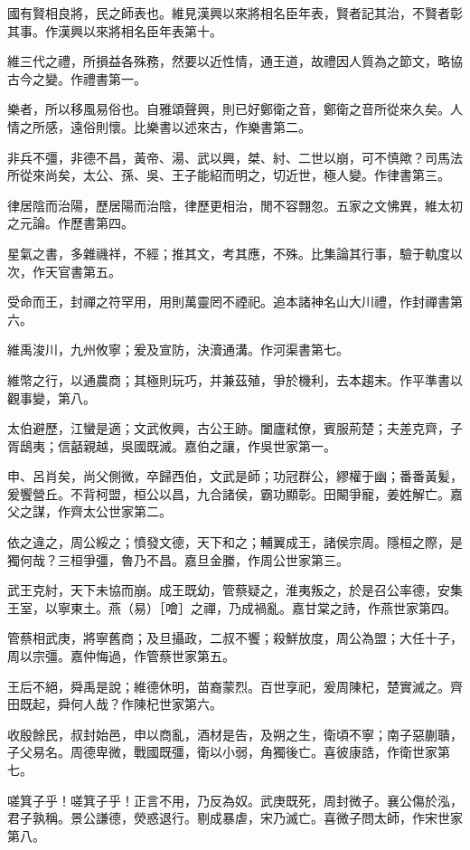 \begin{pinyinscope}
國有賢相良將，民之師表也。維見漢興以來將相名臣年表，賢者記其治，不賢者彰其事。作漢興以來將相名臣年表第十。

維三代之禮，所損益各殊務，然要以近性情，通王道，故禮因人質為之節文，略協古今之變。作禮書第一。

樂者，所以移風易俗也。自雅頌聲興，則已好鄭衛之音，鄭衛之音所從來久矣。人情之所感，遠俗則懷。比樂書以述來古，作樂書第二。

非兵不彊，非德不昌，黃帝、湯、武以興，桀、紂、二世以崩，可不慎歟？司馬法所從來尚矣，太公、孫、吳、王子能紹而明之，切近世，極人變。作律書第三。

律居陰而治陽，歷居陽而治陰，律歷更相治，閒不容翲忽。五家之文怫異，維太初之元論。作歷書第四。

星氣之書，多雜禨祥，不經；推其文，考其應，不殊。比集論其行事，驗于軌度以次，作天官書第五。

受命而王，封禪之符罕用，用則萬靈罔不禋祀。追本諸神名山大川禮，作封禪書第六。

維禹浚川，九州攸寧；爰及宣防，決瀆通溝。作河渠書第七。

維幣之行，以通農商；其極則玩巧，并兼茲殖，爭於機利，去本趨末。作平準書以觀事變，第八。

太伯避歷，江蠻是適；文武攸興，古公王跡。闔廬弒僚，賓服荊楚；夫差克齊，子胥鴟夷；信嚭親越，吳國既滅。嘉伯之讓，作吳世家第一。

申、呂肖矣，尚父側微，卒歸西伯，文武是師；功冠群公，繆權于幽；番番黃髪，爰饗營丘。不背柯盟，桓公以昌，九合諸侯，霸功顯彰。田闞爭寵，姜姓解亡。嘉父之謀，作齊太公世家第二。

依之違之，周公綏之；憤發文德，天下和之；輔翼成王，諸侯宗周。隱桓之際，是獨何哉？三桓爭彊，魯乃不昌。嘉旦金縢，作周公世家第三。

武王克紂，天下未協而崩。成王既幼，管蔡疑之，淮夷叛之，於是召公率德，安集王室，以寧東土。燕（易）［噲］之禪，乃成禍亂。嘉甘棠之詩，作燕世家第四。

管蔡相武庚，將寧舊商；及旦攝政，二叔不饗；殺鮮放度，周公為盟；大任十子，周以宗彊。嘉仲悔過，作管蔡世家第五。

王后不絕，舜禹是說；維德休明，苗裔蒙烈。百世享祀，爰周陳杞，楚實滅之。齊田既起，舜何人哉？作陳杞世家第六。

收殷餘民，叔封始邑，申以商亂，酒材是告，及朔之生，衛頃不寧；南子惡蒯聵，子父易名。周德卑微，戰國既彊，衛以小弱，角獨後亡。喜彼康誥，作衛世家第七。

嗟箕子乎！嗟箕子乎！正言不用，乃反為奴。武庚既死，周封微子。襄公傷於泓，君子孰稱。景公謙德，熒惑退行。剔成暴虐，宋乃滅亡。喜微子問太師，作宋世家第八。


\end{pinyinscope}
